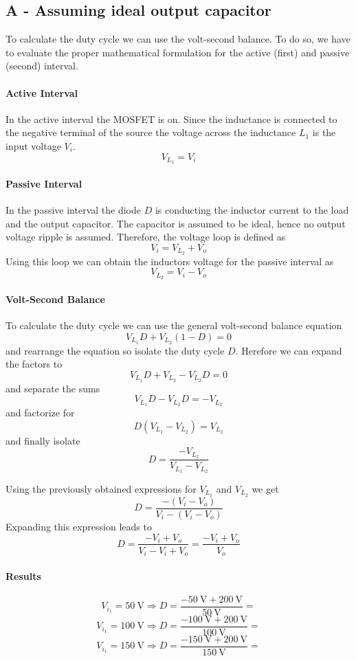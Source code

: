 \subsection{A - Assuming ideal output capacitor}
To calculate the duty cycle we can use the volt-second balance.
To do so, we have to evaluate the proper mathematical formulation
for the active (first) and passive (second) interval.

\paragraph{Active Interval}
In the active interval the MOSFET is on. Since the inductance is
connected to the negative terminal of the source the voltage across
the inductance $L_1$ is the input voltage $V_i$. 
\[ V_{L_{1}} = V_i \]

\paragraph{Passive Interval}
In the passive interval the diode $D$ is conducting the inductor
current to the load and the output capacitor. The capacitor is assumed
to be ideal, hence no output voltage ripple is assumed. Therefore, the
voltage loop is defined as
\[ V_i = V_{L_{2}} + V_o \]
Using this loop we can obtain the inductors voltage for the passive
interval as
\[ V_{L_{2}} = V_i - V_o \]

\paragraph{Volt-Second Balance}
To calculate the duty cycle we can use the general volt-second balance
equation
\[ V_{L_{1}} D + V_{L_{2}} (1-D) = 0 \]
and rearrange the equation so isolate the duty cycle $D$. Herefore
we can expand the factors to
\[ V_{L_{1}} D + V_{L_{2}} - V_{L_{2}} D = 0 \]
and separate the sums
\[ V_{L_{1}} D - V_{L_{2}} D = - V_{L_{2}} \]
and factorize for
\[ D (V_{L_{1}} - V_{L_{2}}) = V_{L_{2}} \]
and finally isolate 
\[ D = \frac{- V_{L_{2}}}{V_{L_{1}} - V_{L_{2}}} \]

Using the previously obtained expressions for $V_{L_{1}}$ and
$V_{L_{2}}$ we get
\[  D = \frac{-(V_i - V_o)}{V_i - (V_i - V_o)} \]
Expanding this expression leads to
\[ D = \frac{- V_i + V_o}{V_i - V_i + V_o} = \frac{- V_i + V_o}{V_o} \]

\paragraph{Results}
\[ V_{i_{1}} = \SI{50}{\volt}  \Rightarrow D = \frac{- \SI{50}{\volt}  + \SI{200}{\volt}}{\SI{50}{\volt}}  =  \]
\[ V_{i_{1}} = \SI{100}{\volt} \Rightarrow D = \frac{- \SI{100}{\volt} + \SI{200}{\volt}}{\SI{100}{\volt}} =  \]
\[ V_{i_{1}} = \SI{150}{\volt} \Rightarrow D = \frac{- \SI{150}{\volt} + \SI{200}{\volt}}{\SI{150}{\volt}} =  \]
